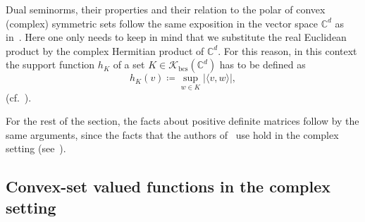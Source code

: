 \documentclass{article}
\theoremstyle{definition}
\theoremstyle{remark}
\numberwithin{equation}{section}
\newcommand{\cK}{\mathcal{K}}
\newcommand{\complex}{\mathbb{C}}
\newcommand{\convex}{\cK_{\mathrm{bcs}}}
\newcommand{\1}{\mathbf{1}}
\begin{document}
    Dual seminorms, their properties and their relation to
    the polar of convex (complex) symmetric sets follow the same exposition
    in the vector space $\complex^d$ as in~\cite{Cruz_Uribe_Bownik_Extrapolation}.
    Here one only needs to keep in mind that we substitute the real Euclidean product
    by the complex Hermitian product of $\complex^d.$
    For this reason, in this context the support function $h_K$ of
    a set $K \in \convex(\complex^d)$ has to be defined as
    \begin{equation*}
        h_K(v) \coloneq \sup_{w \in K} |\langle v,w \rangle|,
    \end{equation*}
    (cf.~\cite[Definition~2.12]{Cruz_Uribe_Bownik_Extrapolation}).

    For the rest of the section, the facts about positive definite matrices follow
    by the same arguments,
    since the facts that the authors of~\cite{Cruz_Uribe_Bownik_Extrapolation} use
    hold in the complex setting (see~\cite[Chapter~6]{Bhatia_Positive_definite_matrices_2007}).

    \subsection{Convex-set valued functions in the complex setting}
\end{document}
